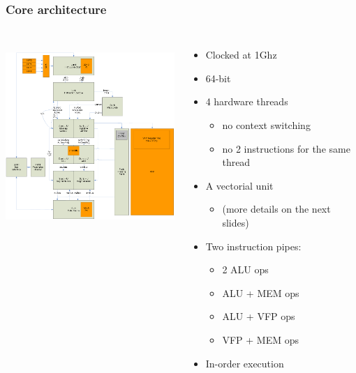 \documentclass{beamer}
\begin{document}
\begin{frame}
  \frametitle{Core architecture}
  \begin{columns}
    \column{20em}
    \includegraphics[width=20em,height=20em]{slides-figures/MIC-core.png}%
    \column{12em}
    \begin{itemize}
      \small
    \item Clocked at 1Ghz
    \item 64-bit
    \item 4 hardware threads
      \begin{itemize}
        \footnotesize
        \item no context switching
        \item no 2 instructions for the same thread
      \end{itemize}
    \item A vectorial unit
      \begin{itemize}
        \footnotesize
        \item (more details on the next slides)
      \end{itemize}
    \item Two instruction pipes:
      \begin{itemize}
        \footnotesize
        \item 2 ALU ops
        \item ALU + MEM ops
        \item ALU + VFP ops
        \item VFP + MEM ops
      \end{itemize}
    \item In-order execution
    \end{itemize}
  \end{columns}
\end{frame}
\end{document}
